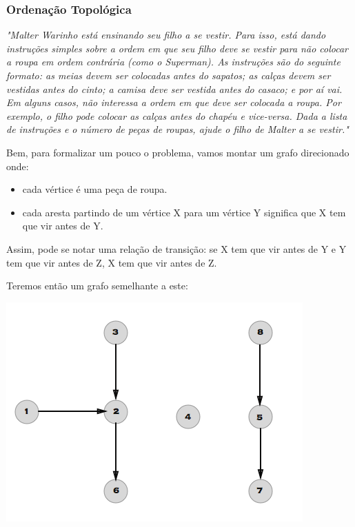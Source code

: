 \documentclass[a4paper,12pt]{article}
\begin{document}
\subsubsection{Ordenação Topológica}

\textit{"Malter Warinho está ensinando seu filho a se vestir. Para isso, está dando instruções simples sobre a ordem em que seu filho deve se vestir para não colocar a roupa em ordem contrária (como o Superman). As instruções são do seguinte formato: as meias devem ser colocadas antes do sapatos; as calças devem ser vestidas antes do cinto; a camisa deve ser vestida antes do casaco; e por aí vai. Em alguns casos, não interessa a ordem em que deve ser colocada a roupa. Por exemplo, o filho pode colocar as calças antes do chapéu e vice-versa. Dada a lista de instruções e o número de peças de roupas, ajude o filho de Malter a se vestir."}\newline

\noindent Bem, para formalizar um pouco o problema, vamos montar um grafo direcionado onde:

\begin{itemize}
    \item cada vértice é uma peça de roupa.
    \item cada aresta partindo de um vértice X para um vértice Y significa que X tem que vir antes de Y.
\end{itemize}

\noindent Assim, pode se notar uma relação de transição: se X tem que vir antes de Y e Y tem que vir antes de Z, X tem que vir antes de Z.

\noindent Teremos então um grafo semelhante a este:

\begin{center}
  \includegraphics[width=\linewidth/2]{figures/grafos/OT.png}
\end{center}
\end{document}
